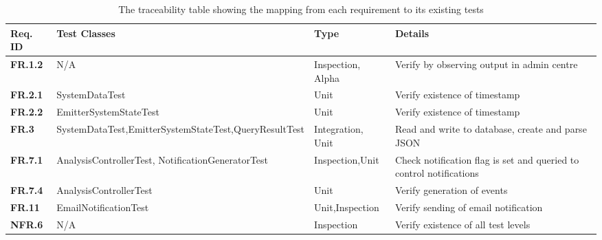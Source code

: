 \documentclass[10pt,a4paper]{article}
\newcommand{\fr}[1]{\textcolor{reqColor}{\textbf{FR.#1}}}
\newcommand{\nfr}[1]{\textcolor{reqColor}{\textbf{NFR.#1}}}
\begin{document}
\begin{table}[H]
\centering
\begin{tabular}{| p{1.5cm} | p{5cm}| p{1.8cm}| p{4.8cm}|}
  \hline\rowcolor{titleColor} \textbf{Req. ID} & \textbf{Test Classes} & \textbf{Type} & \textbf{Details}\\
  \hline \fr{1.2}   & N/A & Inspection, Alpha & Verify by observing output in admin centre\\
  \hline \fr{2.1}   & SystemDataTest & Unit & Verify existence of timestamp\\
  \hline \fr{2.2}   & EmitterSystemStateTest & Unit & Verify existence of timestamp\\
  \hline \fr{3}   & SystemDataTest,\newline EmitterSystemStateTest,\newline QueryResultTest & Integration, Unit & Read and write to database, create and parse JSON\\
  \hline \fr{7.1}   & AnalysisControllerTest, \newline NotificationGeneratorTest & Inspection,\newline Unit & Check notification flag is set and queried to control notifications\\
  \hline \fr{7.4}   & AnalysisControllerTest & Unit & Verify generation of events \\
  \hline \fr{11}    & EmailNotificationTest  & Unit,\newline Inspection & Verify sending of email notification \\
  \hline \nfr{6}    & N/A  & Inspection & Verify existence of all test levels \\
  \hline
  \end{tabular}
  \caption{The traceability table showing the mapping from each requirement to its existing tests}
  \label{tab:traceability}
\end{table}






\vfill


\end{document}
